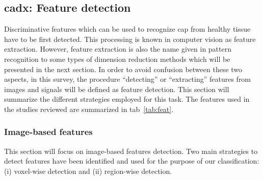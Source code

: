 \subsection{\ac{cadx}: Feature detection} \label{subsec:featuredetection}

Discriminative features which can be used to recognize \ac{cap} from healthy tissue have to be first detected. This processing is known in computer vision as feature extraction. However, feature extraction is also the name given in pattern recognition to some types of dimension reduction methods which will be presented in the next section. In order to avoid confusion between these two aspects, in this survey, the procedure ``detecting'' or ``extracting'' features from images and signals will be defined as feature detection. This section will summarize the different strategies employed for this task. The features used in the studies reviewed are summarized in \ac{tab}~\ref{tab:feat}.

\subsubsection{Image-based features}

This section will focus on image-based features detection. Two main strategies to detect features have been identified and used for the purpose of our classification: (i) voxel-wise detection and (ii) region-wise detection.

